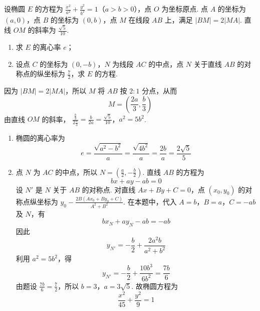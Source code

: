 \begin{problem}
设椭圆 \(E\) 的方程为 \(\frac{x^2}{a^2} + \frac{y^2}{b^2} = 1\)（\(a > b > 0\)），点 \(O\) 为坐标原点. 点 \(A\) 的坐标为 \((a, 0)\)，点 \(B\) 的坐标为 \((0, b)\)，点 \(M\) 在线段 \(AB\) 上，满足 \(|BM| = 2|MA|\). 直线 \(OM\) 的斜率为 \(\frac{\sqrt{5}}{10}\).

\begin{enumerate}
\item 求 \(E\) 的离心率 \(e\)；
\item 设点 \(C\) 的坐标为 \((0, -b)\)，\(N\) 为线段 \(AC\) 的中点，点 \(N\) 关于直线 \(AB\) 的对称点的纵坐标为 \(\frac{7}{2}\)，求 \(E\) 的方程.
\end{enumerate}
\begin{solution}
因为 \(|BM|=2|MA|\)，所以 \(M\) 将 \(AB\) 按 \(2:1\) 分点，从而
\[
M=\left(\frac{2a}{3},\frac b3\right)
\]
由直线 \(OM\) 的斜率，
\(\frac{\frac{b}{3}}{2\frac{a}{3}}=\frac b{2a}=\frac{\sqrt5}{10}\)，\(a^2=5b^2\).

\begin{enumerate}
\item 椭圆的离心率为
\[
e=\frac{\sqrt{a^2-b^2}}a=\frac{\sqrt{4b^2}}a=\frac{2b}{a}=\frac{2\sqrt5}{5}
\]

\item 点 \(N\) 为 \(AC\) 的中点，所以 \(N=(\frac a2,-\frac b2)\). 直线 \(AB\) 的方程为
\[
bx+ay-ab=0
\]
设 \(N'\) 是 \(N\) 关于 \(AB\) 的对称点. 对直线 \(Ax+By+C=0\)，点 \((x_0,y_0)\) 的对称点纵坐标为
\(y_0-\frac{2B(Ax_0+By_0+C)}{A^2+B^2}\). 在本题中，代入 \(A=b\)，\(B=a\)，\(C=-ab\) 及 \(N\)，有
\[
bx_N+ay_N-ab=-ab
\]
因此
\[
y_{N'}=-\frac b2+\frac{2a^2b}{a^2+b^2}
\]
利用 \(a^2=5b^2\)，得
\[
y_{N'}=-\frac b2+\frac{10b^3}{6b^2}=\frac{7b}{6}
\]
由题设 \(\frac{7b}{6}=\frac72\)，所以 \(b=3\)，\(a=3\sqrt5\). 故椭圆方程为
\[
\frac{x^2}{45}+\frac{y^2}{9}=1
\]
\end{enumerate}
\end{solution}
\end{problem}

